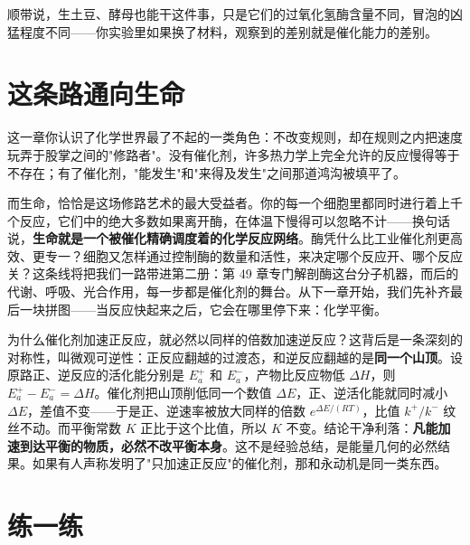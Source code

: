 顺带说，生土豆、酵母也能干这件事，只是它们的过氧化氢酶含量不同，冒泡的凶猛程度不同——你实验里如果换了材料，观察到的差别就是催化能力的差别。

\section{这条路通向生命}

这一章你认识了化学世界最了不起的一类角色：不改变规则，却在规则之内把速度玩弄于股掌之间的"修路者"。没有催化剂，许多热力学上完全允许的反应慢得等于不存在；有了催化剂，"能发生"和"来得及发生"之间那道鸿沟被填平了。

而生命，恰恰是这场修路艺术的最大受益者。你的每一个细胞里都同时进行着上千个反应，它们中的绝大多数如果离开酶，在体温下慢得可以忽略不计——换句话说，\textbf{生命就是一个被催化精确调度着的化学反应网络}。酶凭什么比工业催化剂更高效、更专一？细胞又怎样通过控制酶的数量和活性，来决定哪个反应开、哪个反应关？这条线将把我们一路带进第二册：第 49 章专门解剖酶这台分子机器，而后的代谢、呼吸、光合作用，每一步都是催化剂的舞台。从下一章开始，我们先补齐最后一块拼图——当反应快起来之后，它会在哪里停下来：化学平衡。

\begin{tiaozhan}
为什么催化剂加速正反应，就必然以同样的倍数加速逆反应？这背后是一条深刻的对称性，叫微观可逆性：正反应翻越的过渡态，和逆反应翻越的是\textbf{同一个山顶}。设原路正、逆反应的活化能分别是 $E_a^{+}$ 和 $E_a^{-}$，产物比反应物低 $\Delta H$，则 $E_a^{+}-E_a^{-}=\Delta H$。催化剂把山顶削低同一个数值 $\Delta E$，正、逆活化能就同时减小 $\Delta E$，差值不变——于是正、逆速率被放大同样的倍数 $e^{\Delta E/(RT)}$，比值 $k^{+}/k^{-}$ 纹丝不动。而平衡常数 $K$ 正比于这个比值，所以 $K$ 不变。结论干净利落：\textbf{凡能加速到达平衡的物质，必然不改平衡本身}。这不是经验总结，是能量几何的必然结果。如果有人声称发明了"只加速正反应"的催化剂，那和永动机是同一类东西。
\end{tiaozhan}

\section*{练一练}


